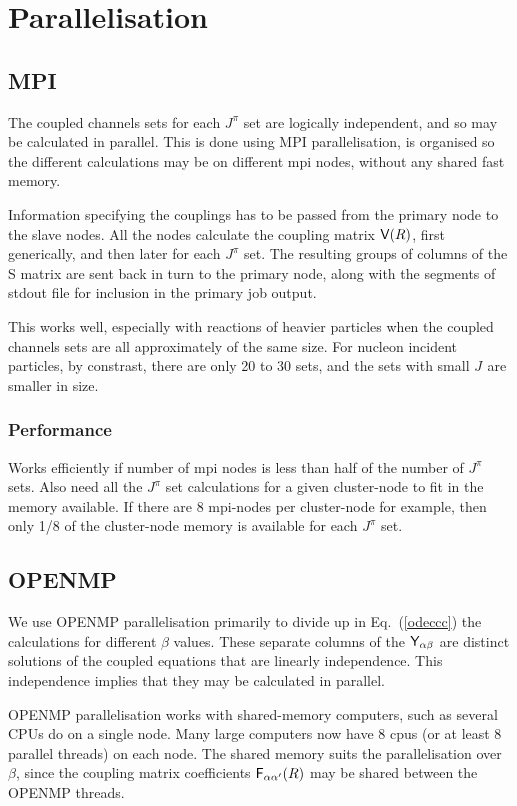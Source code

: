 \documentclass[11pt]{article}
\newcommand{\T}{{}}  %
\begin{document}
\section{Parallelisation}
\subsection{MPI}
The coupled channels sets for each  $J_\T^\pi$ set are logically independent, and so may be calculated in parallel. This is done using MPI parallelisation, is organised so the different calculations may be on different mpi nodes, without any shared fast memory. 

Information specifying the couplings has to be passed from the primary node to the slave nodes. All the nodes calculate the coupling matrix ${\sf V}(R)$, first generically, and then later for each $J_\T^\pi$ set. The resulting groups of columns of the S matrix are sent back in turn to the primary node, along with the segments of stdout file for inclusion in the primary job output.

This works well, especially with reactions of heavier particles when the coupled channels sets are all approximately of the same size. For nucleon incident particles, by constrast, there are only 20  to 30 sets, and the sets with small $J_\T$ are smaller in size.


\subsubsection*{Performance}
Works efficiently if number of mpi nodes is less than half of the number of $J_\T^\pi$ sets.
Also need all the $J_\T^\pi$ set calculations for a given cluster-node to fit in the memory available.  If there are 8 mpi-nodes per cluster-node for example, then only 1/8 of the cluster-node memory is available for each $J_\T^\pi$ set.

\subsection{OPENMP}

We use OPENMP parallelisation primarily to divide up in Eq.\ (\ref{odeccc}) the calculations for different $\beta$ values. These separate columns of the ${\sf Y}_{\alpha \beta}$ are distinct solutions of the coupled equations that are linearly independence. This independence implies that they may be calculated in parallel. 

OPENMP parallelisation works with shared-memory computers, such as several CPUs do on a single node. Many large computers now have 8 cpus (or at least 8 parallel threads) on each node. The shared memory suits the parallelisation over $\beta$, since the coupling matrix coefficients  ${\sf F}_{\alpha \alpha'}(R)$ may be shared between the OPENMP threads.
\end{document}
